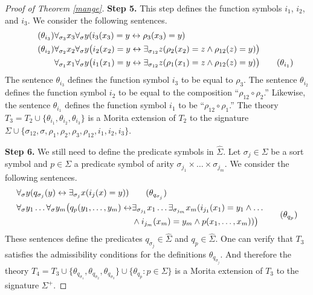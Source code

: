 \begin{proof}[Proof of Theorem \ref{mange}]
\textbf{Step 5.} This step defines the function symbols $i_1$, $i_2$, and $i_3$. We consider the following sentences.
\begin{align*}
\tag{$\theta_{i_3}$}
&\forall_{\sigma_3} x_3 \forall_{\sigma} y(i_3(x_3)=y\leftrightarrow \rho_3(x_3)=y)\\
\tag{$\theta_{i_{2}}$}
%
&\forall_{\sigma_{2}}x_{2} \forall_{\sigma} y\big(i_{2}(x_{2})=y\leftrightarrow\exists_{\sigma_{12}} z( \rho_{2}(x_{2})=z\land\rho_{12}(z)=y)\big)\\
%
&\forall_{\sigma_1}x_1\forall_{\sigma}y\big(i_1(x_1)=y\leftrightarrow\exists_{\sigma_{12}} z(\rho_1(x_1)=z\land\rho_{12}(z)=y)\big)
\tag{$\theta_{i_1}$}
\end{align*}
The sentence $\theta_{i_3}$ defines the function symbol $i_3$ to be equal to $\rho_3$. The sentence $\theta_{i_{2}}$ defines the function symbol $i_{2}$ to be equal to the composition ``$\rho_{12}\circ\rho_{2}$.'' Likewise, the sentence $\theta_{i_{1}}$ defines the function symbol $i_{1}$ to be ``$\rho_{12}\circ\rho_{1}$.'' The theory $T_3=T_{2}\cup\{\theta_{i_1},\theta_{i_2}, \theta_{i_3}\}$
is a Morita extension of $T_{2}$ to the signature $\Sigma\cup\{\sigma_{12}, \sigma, \rho_1, \rho_2, \rho_3, \rho_{12}, i_1, i_2, i_3\}$.

\textbf{Step 6.} We still need to define the predicate symbols in $\widehat{\Sigma}$. Let $\sigma_j\in\Sigma$ be a sort symbol and $p\in\Sigma$ a predicate symbol of arity $\sigma_{j_1}\times\ldots\times\sigma_{j_m}$. We consider the following sentences.
\begin{align*}
&\begin{aligned}
\forall_{\sigma} y(q_{\sigma_j}(y)\leftrightarrow\exists_{\sigma_j} x(i_j(x)=y))
\end{aligned}
\tag{$\theta_{q_{\sigma_j}}$}\\
%
&\begin{aligned}
\forall_\sigma y_1\ldots\forall_\sigma y_m\big(q_{p}(y_1,\ldots, y_m)\leftrightarrow&\exists_{\sigma_{j_1}} x_1\ldots\exists_{\sigma_{j_m}} x_m(i_{j_1}(x_1)=y_1\land\ldots\\&\land i_{j_m}(x_m)=y_m\land p(x_1,\ldots, x_m))\big)
\end{aligned}
\tag{$\theta_{q_{p}}$}
\end{align*}
These sentences define the predicates $q_{\sigma_j}\in\widehat{\Sigma}$ and $q_p\in\widehat{\Sigma}$. One can verify that $T_3$ satisfies the admissibility conditions for the definitions $\theta_{q_{\sigma_j}}$. And therefore the theory $T_{4}=T_3\cup\{\theta_{q_{\sigma_1}}, \theta_{q_{\sigma_2}}, \theta_{q_{\sigma_3}}\}\cup\{\theta_{q_{p}}: p\in\Sigma\}$ is a Morita extension of $T_3$ to the signature $\Sigma^+$.


\end{proof}
